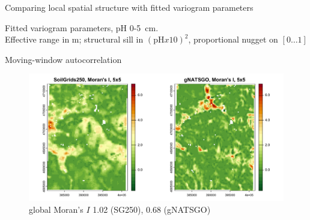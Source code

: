 \documentclass[aspectratio=169]{beamer}
\begin{document}
\begin{frame}{Comparing local spatial structure with fitted variogram parameters}



\par
Fitted variogram parameters, pH 0-5~cm.
\\
Effective range in m; structural sill in $(\mathrm{pH}x10)^2$, proportional nugget on $[0 \ldots 1]$    
\end{frame}

\begin{frame}{Moving-window autocorrelation}
    \begin{figure}
        \centering
        \includegraphics[height=0.7\textheight]{./graphics_david/moving-window-5-1.png}
        \\global Moran's $I$ 1.02 (SG250), 0.68 (gNATSGO)
    \end{figure}
\end{frame}
\end{document}
